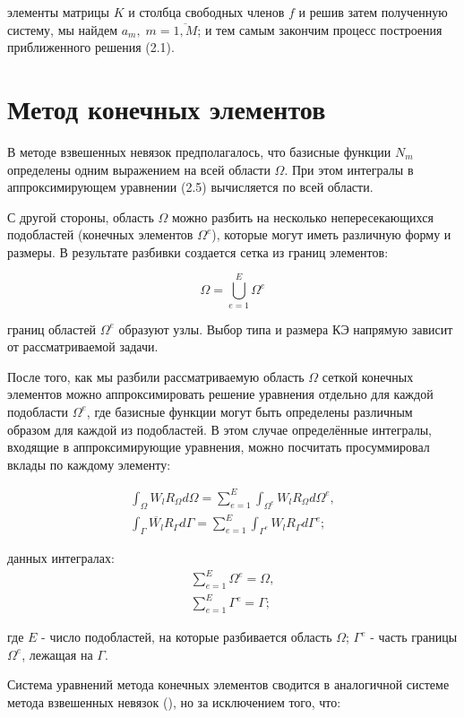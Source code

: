 \documentclass[14pt]{extreport}
\begin{document}
 элементы матрицы $K$ и столбца свободных членов $f$ и решив затем полученную систему, мы найдем $a_m,\; m=\overline{1,M}$; и тем самым закончим процесс построения приближенного решения (2.1).
\\

\section{Метод конечных элементов}
В методе взвешенных невязок предполагалось, что базисные функции $N_m$ определены одним выражением на всей области $\Omega$. При этом интегралы в аппроксимирующем уравнении (2.5) вычисляется по всей области.

С другой стороны, область $\Omega$ можно разбить на несколько непересекающихся подобластей (конечных элементов $\Omega^e$), которые могут иметь различную форму и размеры. В результате разбивки создается сетка из границ элементов:

$$\Omega=\bigcup\limits_{e=1}^E\Omega^{e}$$


 границ областей $\Omega^{e}$ образуют узлы. Выбор типа и размера КЭ напрямую зависит от рассматриваемой задачи.

После того, как мы разбили рассматриваемую область $\Omega$ сеткой конечных элементов можно аппроксимировать решение уравнения отдельно для каждой подобласти $\Omega^{e}$, где базисные функции могут быть определены различным образом для каждой из подобластей. В этом случае определённые интегралы, входящие в аппроксимирующие уравнения, можно посчитать просуммировал вклады по каждому элементу:

\begin{gather}
\int_\Omega W_l R_\Omega d\Omega = \sum\limits_{e=1}^E\int_{\Omega^{e}} W_l R_\Omega d\Omega^e, \nonumber\\
\int_\Gamma \overline{W_l} R_\Gamma d\Gamma = \sum\limits_{e=1}^E\int_{\Gamma^{e}} W_l R_\Gamma d\Gamma^e;
\end{gather}


 данных интегралах:
\begin{gather}
\sum\limits_{e=1}^E\Omega^e=\Omega, \\
\sum\limits_{e=1}^E\Gamma^e=\Gamma;
\end{gather}


\noindent где $E$ - число подобластей, на которые разбивается область $\Omega$; $\Gamma^e$ - часть границы $\Omega^e$, лежащая на $\Gamma$.

Система уравнений метода конечных элементов сводится в аналогичной системе метода взвешенных невязок (), но за исключением того, что:
\end{document}
